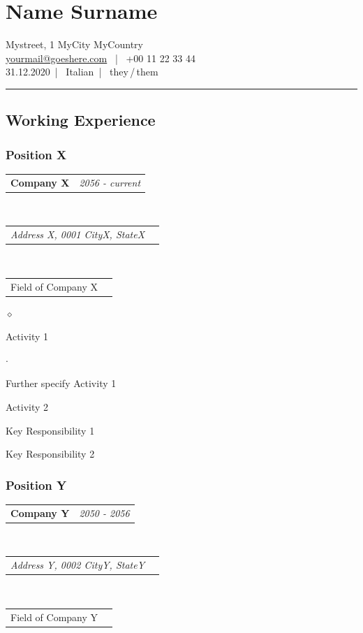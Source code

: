 \documentclass[a4paper]{article}
\makeatletter
\def\name{Name Surname}
\def\email{yourmail@goeshere.com}
\def\telephone{+00 11 22 33 44}
\def\nationality{Italian}
\def\dateofbirth{31.12.2020}
\def\gender{they\,/\,them}
\def\address{Mystreet, 1 \newline 0123 MyCity \newline MyCountry}
\newlength{\sectsep}
\newlength{\detsep}
\newcommand{\headerrow}[2]
{\begin{tabular*}{\textwidth}{l@{\extracolsep{\fill}}r}
    #1 &
    #2 \\
\end{tabular*}}
\renewenvironment{itemize}{
  \begin{list}{$\diamond$}{
    \setlength{\topsep}{0.25em}
    \setlength{\itemsep}{0em}
    \setlength{\parskip}{0pt}
    \setlength{\parsep}{0em}
  }
}{
  \end{list}
}
\newenvironment{itemize2}{
  \begin{list}{$\cdot$}{
    \setlength{\topsep}{0.25em}
    \setlength{\itemsep}{0em}
    \setlength{\parskip}{0pt}
    \setlength{\parsep}{0em}
  }
}{
  \end{list}
}
\makeatother
\begin{document}
    \vspace{0.2\sectsep}
    \section*{\name}
    \vspace{\detsep}
    \address \vspace{\detsep} \\
    \href{mailto:\email}{\email} ~|~ \telephone \vspace{\detsep} \\
    \dateofbirth ~|~ \nationality ~|~ \gender \vspace{\detsep} \\

    \hrule %

    \subsection*{Working Experience}
      \subsubsection*{Position X}
      \headerrow
        {\textbf{Company X}}{\emph{2056 - current}}
      \\
      \headerrow
        {\emph{Address X, 0001 CityX, StateX}}{}
      \\
      \headerrow
        {Field of Company X}{}

      \begin{itemize}
          \item Activity 1
          \begin{itemize2}
              \item Further specify Activity 1
          \end{itemize2}
          \item Activity 2
          \item Key Responsibility 1
          \item Key Responsibility 2
      \end{itemize}

      \subsubsection*{Position Y}
      \headerrow
        {\textbf{Company Y}}{\emph{2050 - 2056}}
      \\
      \headerrow
        {\emph{Address Y, 0002 CityY, StateY}}{}
      \\
      \headerrow
          {Field of Company Y}{}
\end{document}
